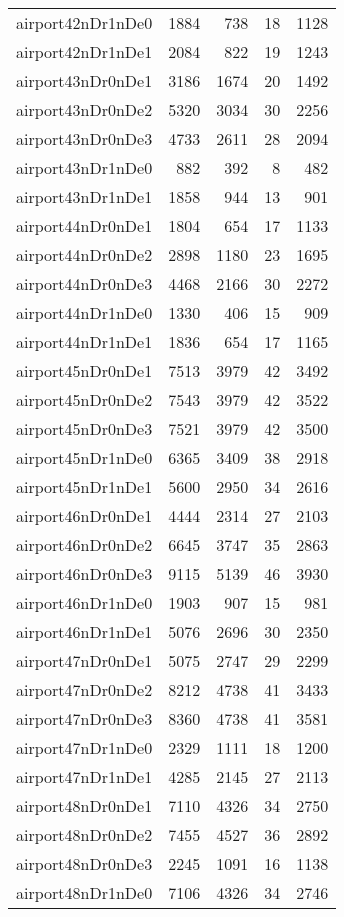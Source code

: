 \begin{longtable}{lrrrr}
airport42nDr1nDe0 & 1884 & 738 & 18 & 1128 \\
airport42nDr1nDe1 & 2084 & 822 & 19 & 1243 \\
airport43nDr0nDe1 & 3186 & 1674 & 20 & 1492 \\
airport43nDr0nDe2 & 5320 & 3034 & 30 & 2256 \\
airport43nDr0nDe3 & 4733 & 2611 & 28 & 2094 \\
airport43nDr1nDe0 & 882 & 392 & 8 & 482 \\
airport43nDr1nDe1 & 1858 & 944 & 13 & 901 \\
airport44nDr0nDe1 & 1804 & 654 & 17 & 1133 \\
airport44nDr0nDe2 & 2898 & 1180 & 23 & 1695 \\
airport44nDr0nDe3 & 4468 & 2166 & 30 & 2272 \\
airport44nDr1nDe0 & 1330 & 406 & 15 & 909 \\
airport44nDr1nDe1 & 1836 & 654 & 17 & 1165 \\
airport45nDr0nDe1 & 7513 & 3979 & 42 & 3492 \\
airport45nDr0nDe2 & 7543 & 3979 & 42 & 3522 \\
airport45nDr0nDe3 & 7521 & 3979 & 42 & 3500 \\
airport45nDr1nDe0 & 6365 & 3409 & 38 & 2918 \\
airport45nDr1nDe1 & 5600 & 2950 & 34 & 2616 \\
airport46nDr0nDe1 & 4444 & 2314 & 27 & 2103 \\
airport46nDr0nDe2 & 6645 & 3747 & 35 & 2863 \\
airport46nDr0nDe3 & 9115 & 5139 & 46 & 3930 \\
airport46nDr1nDe0 & 1903 & 907 & 15 & 981 \\
airport46nDr1nDe1 & 5076 & 2696 & 30 & 2350 \\
airport47nDr0nDe1 & 5075 & 2747 & 29 & 2299 \\
airport47nDr0nDe2 & 8212 & 4738 & 41 & 3433 \\
airport47nDr0nDe3 & 8360 & 4738 & 41 & 3581 \\
airport47nDr1nDe0 & 2329 & 1111 & 18 & 1200 \\
airport47nDr1nDe1 & 4285 & 2145 & 27 & 2113 \\
airport48nDr0nDe1 & 7110 & 4326 & 34 & 2750 \\
airport48nDr0nDe2 & 7455 & 4527 & 36 & 2892 \\
airport48nDr0nDe3 & 2245 & 1091 & 16 & 1138 \\
airport48nDr1nDe0 & 7106 & 4326 & 34 & 2746 \\

\end{longtable}
